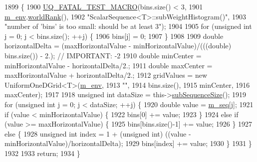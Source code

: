 \begin{DoxyCode}
1899 \{
1900   \hyperlink{_defines_8h_a56d63d18d0a6d45757de47fcc06f574d}{UQ\_FATAL\_TEST\_MACRO}(bins.size() < 3,
1901                       \hyperlink{class_q_u_e_s_o_1_1_scalar_sequence_a71618cd6351b29361b437af68447a4c8}{m\_env}.\hyperlink{class_q_u_e_s_o_1_1_base_environment_a78b57112bbd0e6dd0e8afec00b40ffa7}{worldRank}(),
1902                       \textcolor{stringliteral}{"ScalarSequence<T>::subWeightHistogram()"},
1903                       \textcolor{stringliteral}{"number of 'bins' is too small: should be at least 3"});
1904 
1905   \textcolor{keywordflow}{for} (\textcolor{keywordtype}{unsigned} \textcolor{keywordtype}{int} j = 0; j < bins.size(); ++j) \{
1906     bins[j] = 0;
1907   \}
1908 
1909   \textcolor{keywordtype}{double} horizontalDelta = (maxHorizontalValue - minHorizontalValue)/(((\textcolor{keywordtype}{double}) bins.size()) - 2.); \textcolor{comment}{//
       IMPORTANT: -2}
1910   \textcolor{keywordtype}{double} minCenter = minHorizontalValue - horizontalDelta/2.;
1911   \textcolor{keywordtype}{double} maxCenter = maxHorizontalValue + horizontalDelta/2.;
1912   gridValues = \textcolor{keyword}{new} UniformOneDGrid<T>(\hyperlink{class_q_u_e_s_o_1_1_scalar_sequence_a71618cd6351b29361b437af68447a4c8}{m\_env},
1913                                              \textcolor{stringliteral}{""},
1914                                              bins.size(),
1915                                        minCenter,
1916                                        maxCenter);
1917 
1918   \textcolor{keywordtype}{unsigned} \textcolor{keywordtype}{int} dataSize = this->\hyperlink{class_q_u_e_s_o_1_1_scalar_sequence_a0288ea295eedc216a1617b3286f6f3a0}{subSequenceSize}();
1919   \textcolor{keywordflow}{for} (\textcolor{keywordtype}{unsigned} \textcolor{keywordtype}{int} j = 0; j < dataSize; ++j) \{
1920     \textcolor{keywordtype}{double} value = \hyperlink{class_q_u_e_s_o_1_1_scalar_sequence_ae616036fd2e62fb69df167814545e893}{m\_seq}[j];
1921     \textcolor{keywordflow}{if} (value < minHorizontalValue) \{
1922       bins[0] += value;
1923     \}
1924     \textcolor{keywordflow}{else} \textcolor{keywordflow}{if} (value >= maxHorizontalValue) \{
1925       bins[bins.size()-1] += value;
1926     \}
1927     \textcolor{keywordflow}{else} \{
1928       \textcolor{keywordtype}{unsigned} \textcolor{keywordtype}{int} index = 1 + (\textcolor{keywordtype}{unsigned} int) ((value - minHorizontalValue)/horizontalDelta);
1929       bins[index] += value;
1930     \}
1931   \}
1932 
1933   \textcolor{keywordflow}{return};
1934 \}
\end{DoxyCode}
